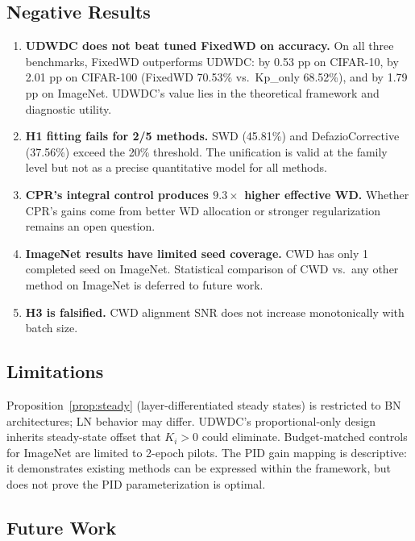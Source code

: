 \documentclass{article}
\begin{document}
\subsection{Negative Results}

\begin{enumerate}
\item \textbf{UDWDC does not beat tuned FixedWD on accuracy.} On all three benchmarks, FixedWD outperforms UDWDC: by 0.53 pp on CIFAR-10, by 2.01 pp on CIFAR-100 (FixedWD 70.53\% vs.~Kp\_only 68.52\%), and by 1.79 pp on ImageNet. UDWDC's value lies in the theoretical framework and diagnostic utility.

\item \textbf{H1 fitting fails for 2/5 methods.} SWD (45.81\%) and DefazioCorrective (37.56\%) exceed the 20\% threshold. The unification is valid at the family level but not as a precise quantitative model for all methods.

\item \textbf{CPR's integral control produces $9.3\times$ higher effective WD.} Whether CPR's gains come from better WD allocation or stronger regularization remains an open question.

\item \textbf{ImageNet results have limited seed coverage.} CWD has only 1 completed seed on ImageNet. Statistical comparison of CWD vs.~any other method on ImageNet is deferred to future work.

\item \textbf{H3 is falsified.} CWD alignment SNR does not increase monotonically with batch size.
\end{enumerate}

\subsection{Limitations}

Proposition~\ref{prop:steady} (layer-differentiated steady states) is restricted to BN architectures; LN behavior may differ. UDWDC's proportional-only design inherits steady-state offset that $K_i > 0$ could eliminate. Budget-matched controls for ImageNet are limited to 2-epoch pilots. The PID gain mapping is descriptive: it demonstrates existing methods can be expressed within the framework, but does not prove the PID parameterization is optimal.

\subsection{Future Work}
\end{document}

